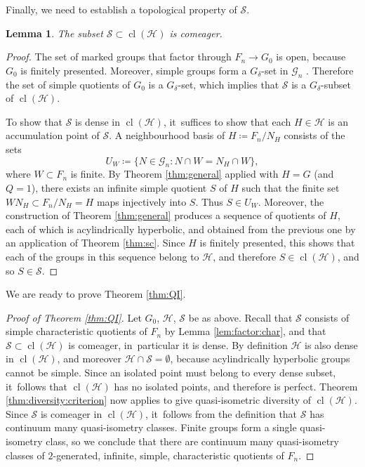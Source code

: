 \documentclass[11pt]{article}
\newtheorem{lemma}[theorem]{Lemma}
\theoremstyle{definition}
\newcommand{\cl}{\operatorname{cl}}
\newcommand{\Gn}{\mathcal{G}_n}
\begin{document}
Finally, we need to establish a topological property of $\mathcal{S}$.

\begin{lemma}
\label{lem:comeager}
The subset $\mathcal{S} \subset \cl(\mathcal{H})$ is comeager.
\end{lemma}

\begin{proof}
The set of marked groups that factor through $F_n \to G_0$ is open, because $G_0$ is finitely presented. Moreover, simple groups form a $G_\delta$-set in $\Gn$ \cite[Cor.\,4.5]{diversity}. Therefore the set of simple quotients of $G_0$ is a $G_\delta$-set, which implies that $\mathcal{S}$ is a $G_\delta$-subset of $\cl(\mathcal{H})$.

To show that $\mathcal{S}$ is dense in $\cl(\mathcal{H})$, it~suffices to show that each $H \in \mathcal{H}$ is an accumulation point of $\mathcal{S}$. A neighbourhood basis of $H \coloneqq F_n / N_H$ consists of the sets
\begin{equation*}
U_W \coloneqq \{ N \in \Gn : N \cap W = N_H \cap W \},
\end{equation*}
where $W \subset F_n$ is finite. By Theorem \ref{thm:general} applied with $H = G$ (and $Q = 1$), there exists an infinite simple quotient $S$ of $H$ such that the finite set $W N_H \subset F_n / N_H = H$ maps injectively into $S$. Thus $S \in U_W$. Moreover, the construction of Theorem \ref{thm:general} produces a sequence of quotients of $H$, each of which is acylindrically hyperbolic, and obtained from the previous one by an application of Theorem \ref{thm:sc}. Since $H$ is finitely presented, this shows that each of the groups in this sequence belong to $\mathcal{H}$, and therefore $S \in \cl(\mathcal{H})$, and so $S \in \mathcal{S}$.
\end{proof}

We are ready to prove Theorem \ref{thm:QI}.

\begin{proof}[Proof of Theorem \ref{thm:QI}]
Let $G_0$, $\mathcal{H}$, $\mathcal{S}$ be as above. Recall that $\mathcal{S}$ consists of simple characteristic quotients of $F_n$ by Lemma \ref{lem:factor:char}, and that $\mathcal{S} \subset \cl(\mathcal{H})$ is comeager, in~particular it is dense.
By definition $\mathcal{H}$ is also dense in $\cl(\mathcal{H})$, and moreover $\mathcal{H} \cap \mathcal{S} = \emptyset$, because acylindrically hyperbolic groups cannot be simple. Since an isolated point must belong to every dense subset, it~follows that $\cl(\mathcal{H})$ has no isolated points, and therefore is perfect.
Theorem \ref{thm:diversity:criterion} now applies to give quasi-isometric diversity of $\cl(\mathcal{H})$. Since $\mathcal{S}$ is comeager in $\cl(\mathcal{H})$, it~follows from the definition that $\mathcal{S}$ has continuum many quasi-isometry classes. Finite groups form a single quasi-isometry class, so we conclude that there are continuum many quasi-isometry classes of $2$-generated, infinite, simple, characteristic quotients of $F_n$.
\end{proof}
\end{document}
